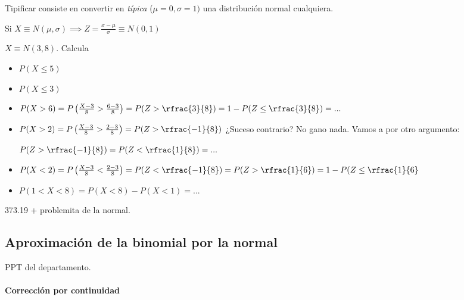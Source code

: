 \begin{defn}[Tipificación]
Tipificar consiste en convertir en \textit{típica} ($\mu=0,\sigma=1)$ una distribución normal cualquiera.

Si $X\equiv N(\mu,\sigma) \implies Z = \displaystyle\frac{x-\mu}{\sigma} \equiv N(0,1)$
\end{defn}

\begin{example} $X\equiv N(3,8)$. Calcula
\begin{itemize}
    \item $P(X\leq 5)$
    \item $P(X\leq 3)$
    \item $P(X>6) = P\left(\frac{X-3}{8} > \frac{6-3}{8}\right) = P(Z>\rfrac{3}{8}) = 1-P(Z\leq\rfrac{3}{8}) = ... $
    \item $P(X>2) = P\left(\frac{X-3}{8} > \frac{2-3}{8}\right) = P(Z>\rfrac{-1}{8})$ ¿Suceso contrario? No gano nada. Vamos a por otro argumento: 
    
    $P(Z>\rfrac{-1}{8}) = P(Z<\rfrac{1}{8}) = ...$
    \item $P(X<2) =  P\left(\frac{X-3}{8} < \frac{2-3}{8}\right) = P(Z<\rfrac{-1}{8}) = P(Z>\rfrac{1}{6}) = 1-P(Z\leq \rfrac{1}{6}
    $
    \item $P(1<X<8) = P(X<8) - P(X<1) = ...$
\end{itemize}
373.19 + problemita de la normal.

\subsection{Aproximación de la binomial por la normal}
PPT del departamento.

\paragraph{Corrección por continuidad}

\end{example}
